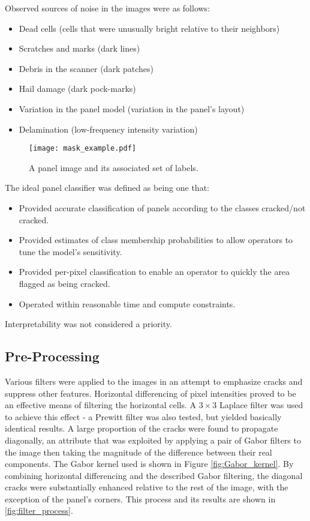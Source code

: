 \documentclass[11pt]{article} %
\begin{document}
Observed sources of noise in the images were as follows:
\begin{itemize}
	\item Dead cells (cells that were unusually bright relative to their neighbors)
	\item Scratches and marks (dark lines)
	\item Debris in the scanner (dark patches)
	\item Hail damage (dark pock-marks)
	\item Variation in the panel model (variation in the panel's layout)
	\item Delamination (low-frequency intensity variation)
\end{itemize}

\begin{figure}[h!]
\centering
\texttt{[image: mask\_example.pdf]}
\caption{A panel image and its associated set of labels.}
\label{fig:mask_example}
\end{figure}

The ideal panel classifier was defined as being one that:
\begin{itemize}
	\item Provided accurate classification of panels according to the classes cracked/not cracked.
	\item Provided estimates of class membership probabilities to allow operators to tune the model's sensitivity.
	\item Provided per-pixel classification to enable an operator to quickly the area flagged as being cracked.
	\item Operated within reasonable time and compute constraints.
\end{itemize}
Interpretability was not considered a priority.


\subsection{Pre-Processing}
Various filters were applied to the images in an attempt to emphasize cracks and suppress other features. Horizontal differencing of pixel intensities proved to be an effective means of filtering the horizontal cells. A $3\times3$ Laplace filter was used to achieve this effect - a Prewitt filter was also tested, but yielded basically identical results.  A large proportion of the cracks were found to propagate diagonally, an attribute that was exploited by applying a pair of Gabor filters to the image then taking the magnitude of the difference between their real components. The Gabor kernel used is shown in Figure \ref{fig:Gabor_kernel}. By combining horizontal differencing and the described Gabor filtering, the diagonal cracks were substantially enhanced relative to the rest of the image, with the exception of the panel's corners. This process and its results are shown in \ref{fig:filter_process}.
\end{document}
